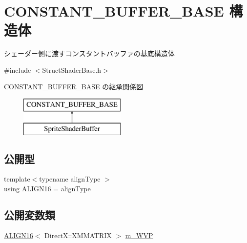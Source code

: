 \hypertarget{struct_d3_d11_1_1_graphic_1_1_c_o_n_s_t_a_n_t___b_u_f_f_e_r___b_a_s_e}{}\section{C\+O\+N\+S\+T\+A\+N\+T\+\_\+\+B\+U\+F\+F\+E\+R\+\_\+\+B\+A\+SE 構造体}
\label{struct_d3_d11_1_1_graphic_1_1_c_o_n_s_t_a_n_t___b_u_f_f_e_r___b_a_s_e}


シェーダー側に渡すコンスタントバッファの基底構造体  




{\ttfamily \#include $<$Struct\+Shader\+Base.\+h$>$}

C\+O\+N\+S\+T\+A\+N\+T\+\_\+\+B\+U\+F\+F\+E\+R\+\_\+\+B\+A\+SE の継承関係図\begin{figure}[H]
\begin{center}
\leavevmode
\includegraphics[height=2.000000cm]{struct_d3_d11_1_1_graphic_1_1_c_o_n_s_t_a_n_t___b_u_f_f_e_r___b_a_s_e}
\end{center}
\end{figure}
\subsection*{公開型}
\begin{DoxyCompactItemize}
\item 
{\footnotesize template$<$typename align\+Type $>$ }\\using \hyperlink{struct_d3_d11_1_1_graphic_1_1_c_o_n_s_t_a_n_t___b_u_f_f_e_r___b_a_s_e_a3443b7ba28a2ff538b5d9f5f82c02b55}{A\+L\+I\+G\+N16} = align\+Type
\end{DoxyCompactItemize}
\subsection*{公開変数類}
\begin{DoxyCompactItemize}
\item 
\hyperlink{struct_d3_d11_1_1_graphic_1_1_c_o_n_s_t_a_n_t___b_u_f_f_e_r___b_a_s_e_a3443b7ba28a2ff538b5d9f5f82c02b55}{A\+L\+I\+G\+N16}$<$ Direct\+X\+::\+X\+M\+M\+A\+T\+R\+IX $>$ \hyperlink{struct_d3_d11_1_1_graphic_1_1_c_o_n_s_t_a_n_t___b_u_f_f_e_r___b_a_s_e_aacf5d407ad2a813c4c97615ef5efb006}{m\+\_\+\+W\+VP}
\end{DoxyCompactItemize}


